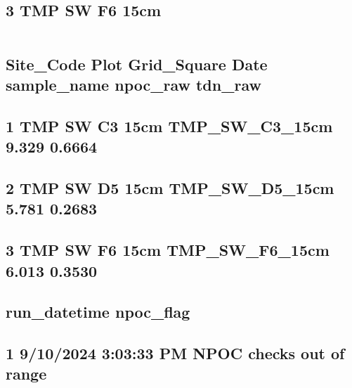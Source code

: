 \documentclass[
]{article}
\begin{document}
\hypertarget{tmp-sw-f6-15cm}{%
\subsection{3 TMP SW F6 15cm}\label{tmp-sw-f6-15cm}}

\begin{verbatim}
\end{verbatim}

\hypertarget{site_code-plot-grid_square-date-sample_name-npoc_raw-tdn_raw}{%
\subsection{Site\_Code Plot Grid\_Square Date sample\_name npoc\_raw
tdn\_raw}\label{site_code-plot-grid_square-date-sample_name-npoc_raw-tdn_raw}}

\hypertarget{tmp-sw-c3-15cm-tmp_sw_c3_15cm-9.329-0.6664}{%
\subsection{1 TMP SW C3 15cm TMP\_SW\_C3\_15cm 9.329
0.6664}\label{tmp-sw-c3-15cm-tmp_sw_c3_15cm-9.329-0.6664}}

\hypertarget{tmp-sw-d5-15cm-tmp_sw_d5_15cm-5.781-0.2683}{%
\subsection{2 TMP SW D5 15cm TMP\_SW\_D5\_15cm 5.781
0.2683}\label{tmp-sw-d5-15cm-tmp_sw_d5_15cm-5.781-0.2683}}

\hypertarget{tmp-sw-f6-15cm-tmp_sw_f6_15cm-6.013-0.3530}{%
\subsection{3 TMP SW F6 15cm TMP\_SW\_F6\_15cm 6.013
0.3530}\label{tmp-sw-f6-15cm-tmp_sw_f6_15cm-6.013-0.3530}}

\hypertarget{run_datetime-npoc_flag}{%
\subsection{run\_datetime npoc\_flag}\label{run_datetime-npoc_flag}}

\hypertarget{pm-npoc-checks-out-of-range}{%
\subsection{1 9/10/2024 3:03:33 PM NPOC checks out of
range}\label{pm-npoc-checks-out-of-range}}
\end{document}
